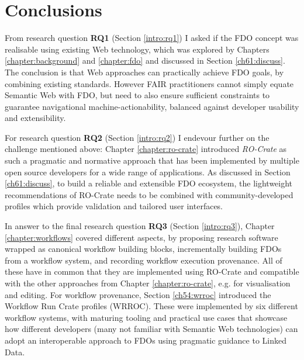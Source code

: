 \section{Conclusions}


From research question \textbf{RQ1} (Section \vref{intro:rq1}) I asked if the 
\acrfull{FDO}
concept was realisable using existing Web technology, which was explored by Chapters \ref{chapter:background} and \ref{chapter:fdo} and discussed in Section \ref{ch61:discuss}. The conclusion is that Web approaches can practically achieve FDO goals, by combining existing standards. However FAIR practitioners cannot simply equate Semantic Web with FDO, but need to also ensure sufficient constraints to guarantee navigational machine-actionability, balanced against developer usability and extensibility. 

For research question \textbf{RQ2} (Section \vref{intro:rq2}) I endevour further on the challenge mentioned above: Chapter \ref{chapter:ro-crate} introduced \emph{RO-Crate} as such a pragmatic and normative approach that has been implemented by multiple open source developers for a wide range of applications. As discussed in Section \ref{ch61:discuss}, to build a reliable and extensible FDO ecosystem, the lightweight recommendations of RO-Crate needs to be combined with community-developed profiles which provide validation and tailored user interfaces.

In answer to the final research question \textbf{RQ3} (Section \vref{intro:rq3}), Chapter \ref{chapter:workflows} covered different aspects, by proposing research software wrapped as canonical workflow building blocks, incrementally building FDOs from a workflow system, and recording workflow execution provenance. All of these have in common that they are implemented using RO-Crate and compatible with the other approaches from Chapter \ref{chapter:ro-crate}, e.g. for visualisation and editing. For workflow provenance, Section \vref{ch54:wrroc} introduced the Workflow Run Crate profiles (WRROC). These were implemented by six different workflow systems, with maturing tooling and practical use cases that showcase how different developers (many not familiar with Semantic Web technologies) can adopt an interoperable approach to FDOs using pragmatic guidance to Linked Data.



